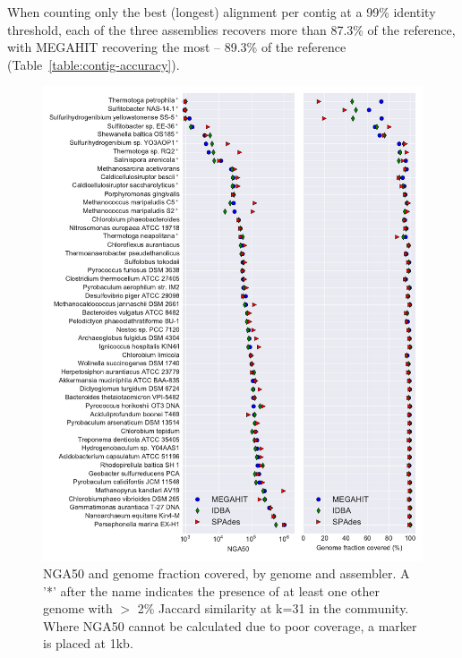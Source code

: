 \documentclass[11pt]{article}
\begin{document}
When counting only the best (longest) alignment per contig at a 99\%
identity threshold, each of the three assemblies recovers more than 87.3\% of the
reference, with MEGAHIT recovering the most -- 89.3\% of the reference
(Table~\ref{table:contig-accuracy}).


\newpage

\begin{figure}[!h]

  
\centering
\includegraphics[width=\textwidth]{combined.pdf}  
\caption{NGA50 and genome fraction covered, by genome and assembler. A '*' after the name indicates the presence of at least one other genome with $>$ 2\% Jaccard similarity at k=31 in the community.  Where NGA50 cannot be calculated due to poor coverage, a marker is placed at 1kb.}
\label{fig:nga50}
\end{figure}

\newpage
\end{document}
